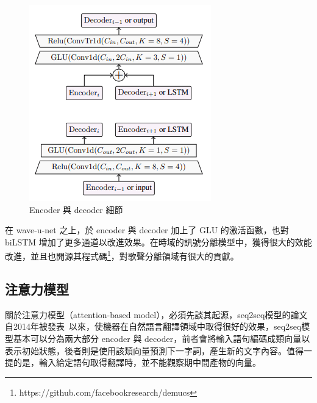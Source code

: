 \begin{figure}[htbp]
\begin{minipage}[t]{0.45\textwidth}
        \includegraphics[width=\textwidth]{./figures/chapter02_method/demucs2.png}
        \caption {Encoder 與 decoder 細節}
        \label{demucs2}
    \end{minipage}
    \hfil
\end{figure}
在 wave-u-net 之上，於 encoder 與 decoder 加上了 GLU 的激活函數，也對 biLSTM 增加了更多通道以改進效果。在時域的訊號分離模型中，獲得很大的效能改進，並且也開源其程式碼\footnote{https://github.com/facebookresearch/demucs}，對歌聲分離領域有很大的貢獻。

\subsection{注意力模型}
關於注意力模型（attention-based model），必須先談其起源，seq2seq模型的論文自2014年被發表~\cite{vaswani2017attention}以來，使機器在自然語言翻譯領域中取得很好的效果，seq2seq模型基本可以分為兩大部分 encoder 與 decoder，前者會將輸入語句編碼成類向量以表示初始狀態，後者則是使用該類向量預測下一字詞，產生新的文字內容。值得一提的是，輸入給定語句取得翻譯時，並不能觀察期中間產物的向量。

